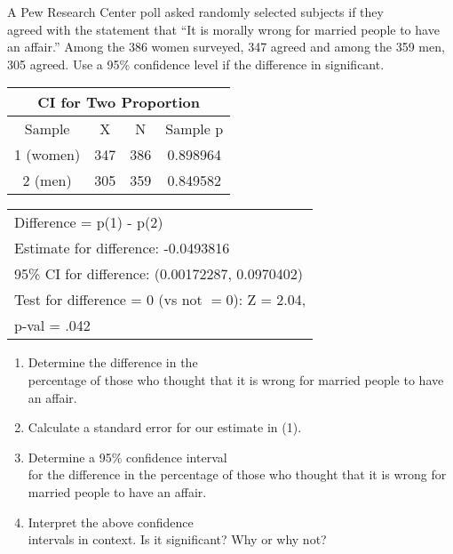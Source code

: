 \documentclass[11pt]{book}\usepackage[]{graphicx}\usepackage[]{color}
\begin{document}
\begin{exercises}
  \begin{exercise} %

A Pew Research Center poll asked randomly selected subjects if they \\ agreed with the statement that ``It is morally wrong for married people to have an affair.''  Among the 386 women surveyed, 347 agreed and among the 359 men, 305 agreed.  Use a 95\% confidence level if the difference in significant.


    {\small{
    \begin{tabular}{@{} cccc @{}} \hline %
       \multicolumn{4}{c}{CI for Two Proportion} \\ \hline
       Sample & X & N & Sample p \\ \hline
       1 (women) & 347 & 386 & 0.898964 \\
       2 (men) & 305 & 359 & 0.849582 \\ \hline
    \end{tabular}
    }}

    {\footnotesize{
    \begin{tabular}{@{} l @{}}
    Difference = p(1) - p(2) \\
    Estimate for difference: -0.0493816 \\
    95\% CI for difference: (0.00172287, 0.0970402)  \\
    Test for difference = 0 (vs not $= 0$): Z = 2.04,  \\ p-val = .042
    \end{tabular}
    }}

\begin{enumerate}
\item Determine the difference in the \\ percentage of those who thought that it is  wrong for married people to have an affair.

\item Calculate a standard error for our estimate in (1).

\item Determine a 95\% confidence interval \\ for the difference in the percentage of those who thought that it is wrong for married people to have an affair.

\item Interpret the above confidence \\ intervals in context.  Is it significant? Why or why not?


\end{enumerate}
\end{exercise}
\end{exercises}
\end{document}
